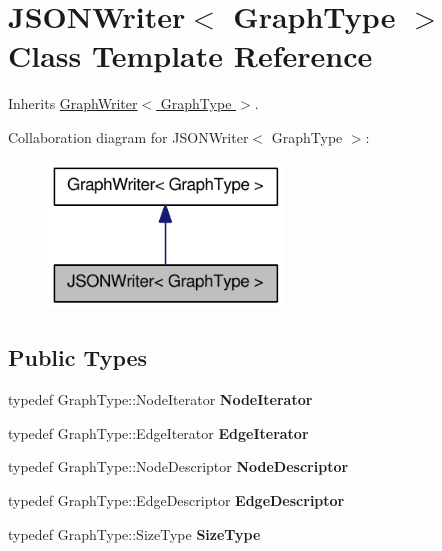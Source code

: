 \hypertarget{class_j_s_o_n_writer}{
\section{JSONWriter$<$ GraphType $>$ Class Template Reference}
\label{class_j_s_o_n_writer}
}


Inherits \hyperlink{class_graph_writer}{GraphWriter$<$ GraphType $>$}.



Collaboration diagram for JSONWriter$<$ GraphType $>$:\nopagebreak
\begin{figure}[H]
\begin{center}
\leavevmode
\includegraphics[width=176pt]{class_j_s_o_n_writer__coll__graph}
\end{center}
\end{figure}
\subsection*{Public Types}
\begin{DoxyCompactItemize}
\item 
\hypertarget{class_j_s_o_n_writer_a6937579c5e9bd1f8f0cfe25b1c8541c4}{
typedef GraphType::NodeIterator {\bfseries NodeIterator}}
\label{class_j_s_o_n_writer_a6937579c5e9bd1f8f0cfe25b1c8541c4}

\item 
\hypertarget{class_j_s_o_n_writer_acdf29f89aa66c55b6a888a72367469f1}{
typedef GraphType::EdgeIterator {\bfseries EdgeIterator}}
\label{class_j_s_o_n_writer_acdf29f89aa66c55b6a888a72367469f1}

\item 
\hypertarget{class_j_s_o_n_writer_a873d2514d502cef3731bb586ba264db0}{
typedef GraphType::NodeDescriptor {\bfseries NodeDescriptor}}
\label{class_j_s_o_n_writer_a873d2514d502cef3731bb586ba264db0}

\item 
\hypertarget{class_j_s_o_n_writer_adb9ee41f66f9c4e1e6bca201a1f312d4}{
typedef GraphType::EdgeDescriptor {\bfseries EdgeDescriptor}}
\label{class_j_s_o_n_writer_adb9ee41f66f9c4e1e6bca201a1f312d4}

\item 
\hypertarget{class_j_s_o_n_writer_a2f39d292d35e6c346e3a3f1d99e0c34c}{
typedef GraphType::SizeType {\bfseries SizeType}}
\label{class_j_s_o_n_writer_a2f39d292d35e6c346e3a3f1d99e0c34c}

\end{DoxyCompactItemize}
